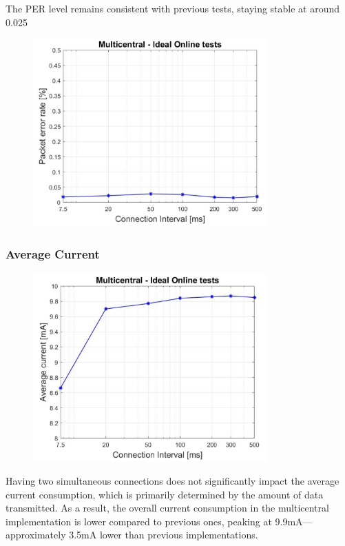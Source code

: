 \documentclass{Configuration_Files/PoliMi3i_thesis}
\begin{document}
The PER level remains consistent with previous tests, staying stable at around 0.025%

\begin{figure}[H]
    \centering
    \includegraphics[width=0.8\textwidth]{Results Manuel/figure28}
    \label{fig:figure1}
\end{figure}

\subsubsection*{Average Current}

\begin{figure}[H]
    \centering
    \includegraphics[width=0.8\textwidth]{Results Manuel/figure29}
    \label{fig:figure1}
\end{figure}

Having two simultaneous connections does not significantly impact the average current consumption, which is primarily determined by the amount of data transmitted. As a result, the overall current consumption in the multicentral implementation is lower compared to previous ones, peaking at 9.9mA—approximately 3.5mA lower than previous implementations.
\end{document}
